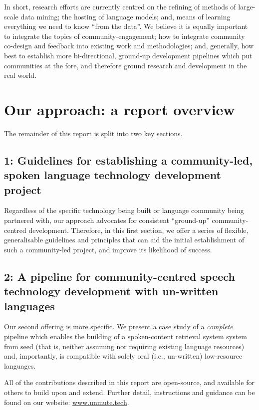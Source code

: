 \documentclass[10pt,twoside,openright]{report}
\begin{document}
In short, research efforts are currently centred on the refining of methods of large-scale data mining; the hosting of language models; and, means of learning everything we need to know ``from the data''.
We believe it is equally important to integrate the topics of community-engagement; how to integrate community co-design and feedback into existing work and methodologies; and, generally, how best to establish more bi-directional, ground-up development pipelines which put communities at the fore, and therefore ground research and development in the real world.


\section{Our approach: a report overview}
The remainder of this report is split into two key sections. 

\subsection{1: Guidelines for establishing a community-led,\texorpdfstring{\\}{ }spoken language technology development project} 
Regardless of the specific technology being built or language community being partnered with, our approach advocates for consistent ``ground-up'' community-centred development.
Therefore, in this first section, we offer a series of flexible, generalisable %
guidelines and principles that can aid the initial establishment of such a community-led project, and improve its likelihood of success.
\subsection{2: A pipeline for community-centred speech\texorpdfstring{\\}{ }technology development with un-written languages}
Our second offering is more specific.
We present a case study of a \textit{complete} pipeline which enables the building of a spoken-content retrieval system system from seed (that is, neither assuming nor requiring existing language resources) and, importantly, is compatible with solely oral (i.e., un-written) low-resource languages.

All of the contributions described in this report are open-source, and available for others to build upon and extend.
Further detail, instructions and guidance can be found on our website: \underline{\href{https://unmute.tech/}{www.unmute.tech}}.
\end{document}
